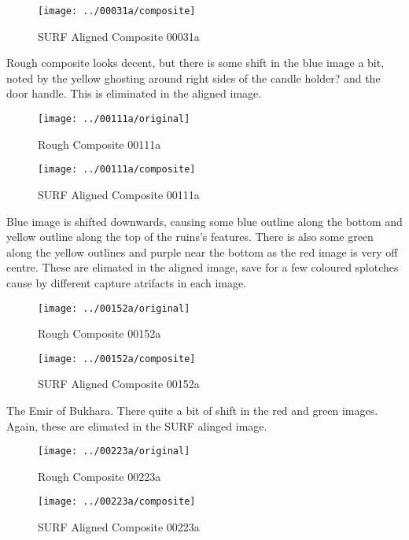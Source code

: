 \documentclass[10pt]{IEEEtran}
\begin{document}
\begin{figure}[!htb]
\caption{SURF Aligned Composite 00031a}
\texttt{[image: ../00031a/composite]}
\end{figure}

\FloatBarrier

Rough composite looks decent, but there is some shift in the blue image a bit, noted by the yellow ghosting around right sides of the candle holder? and the door handle. This is eliminated in the aligned image. 

\begin{figure}[!htb]
\caption{Rough Composite 00111a}
\texttt{[image: ../00111a/original]}
\end{figure}

\begin{figure}[!htb]
\caption{SURF Aligned Composite 00111a}
\texttt{[image: ../00111a/composite]}
\end{figure}

\FloatBarrier

Blue image is shifted downwards, causing some blue outline along the bottom and yellow outline along the top of the ruins's features. There is also some green along the yellow outlines and purple near the bottom as the red image is very off centre. These are elimated in the aligned image, save for a few coloured splotches cause by different capture atrifacts in each image. 


\begin{figure}[!htb]
\caption{Rough Composite 00152a}
\texttt{[image: ../00152a/original]}
\end{figure}

\begin{figure}[!htb]
\caption{SURF Aligned Composite 00152a}
\texttt{[image: ../00152a/composite]}
\end{figure}

\FloatBarrier

The Emir of Bukhara. There quite a bit of shift in the red and green images. Again, these are elimated in the SURF alinged image. 

\begin{figure}[!htb]
\caption{Rough Composite 00223a}
\texttt{[image: ../00223a/original]}
\end{figure}

\begin{figure}[!htb]
\caption{SURF Aligned Composite 00223a}
\texttt{[image: ../00223a/composite]}
\end{figure}
\end{document}
